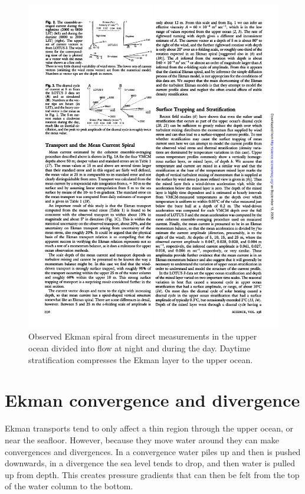 \begin{figure}[hbt]
  \begin{center}
    \includegraphics{figs/Coriolis/ObservedEkmanSpiral}
    \caption{Observed Ekman spiral from direct measurements in the upper ocean divided into flow at night and during the day.  Daytime stratification compresses the Ekman layer to the upper ocean.  \citep{priceetal87}}
    \label{fig:ObservedEkmanSpiral}  
  \end{center}
\end{figure}

\section{Ekman convergence and divergence}

Ekman transports tend to only affect a thin region through the upper ocean, or near the seafloor.  However, because they move water around they can make convergences and divergences.  In a convergence water piles up and then is pushed downwards, in a divergence the sea level tends to drop, and then water is pulled up from depth.  This creates pressure gradients that can then be felt from the top of the water column to the bottom.  


